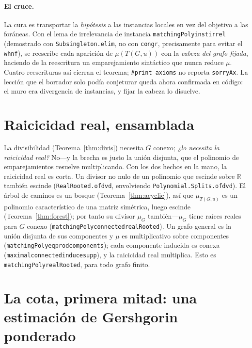 \documentclass[11pt]{article}
\newcommand{\lean}[1]{{\def\_{\textunderscore\allowbreak}\texttt{#1}}}
\newcommand{\R}{\mathbb{R}}
\begin{document}
\paragraph{El cruce.} La cura es transportar la \emph{hip\'otesis} a las instancias
locales en vez del objetivo a las for\'aneas. Con el lema de irrelevancia de
instancia \lean{matchingPoly\_inst\_irrel} (demostrado con \lean{Subsingleton.elim},
no con \lean{congr}, precisamente para evitar el \lean{whnf}), se reescribe cada
aparici\'on de $\mu(T(G,u))$ con la \emph{cabeza del grafo fijada}, haciendo de la
reescritura un emparejamiento sint\'actico que nunca reduce $\mu$. Cuatro
reescrituras as\'i cierran el teorema; \lean{\#print axioms} no reporta
\lean{sorryAx}. La lecci\'on que el borrador solo pod\'ia conjeturar queda ahora
confirmada en c\'odigo: el muro era divergencia de instancias, y fijar la cabeza lo
disuelve.

\section{Raicicidad real, ensamblada}
\label{sec:realrooted}

La divisibilidad (Teorema~\ref{thm:divis}) necesita $G$ conexo; \emph{¿lo necesita
la raicicidad real?} No---y la brecha es justo la uni\'on disjunta, que el polinomio
de emparejamientos resuelve multiplicando. Con los dos hechos en la mano, la
raicicidad real es corta. Un divisor no nulo de un polinomio que escinde sobre $\R$
tambi\'en escinde (\lean{RealRooted.of\_dvd}, envolviendo
\lean{Polynomial.Splits.of\_dvd}). El \'arbol de caminos es un bosque
(Teorema~\ref{thm:acyclic}), as\'i que $\mu_{T(G,u)}$ es un polinomio
caracter\'istico de una matriz sim\'etrica, luego escinde (Teorema~\ref{thm:forest});
por tanto su divisor $\mu_G$ tambi\'en---$\mu_G$ tiene ra\'ices reales para $G$
conexo (\lean{matchingPoly\_connected\_realRooted}). Un grafo general es la uni\'on
disjunta de sus componentes y $\mu$ es multiplicativo sobre componentes
(\lean{matchingPoly\_eq\_prod\_components}); cada componente inducida es conexa
(\lean{maximal\_connected\_induce\_supp}), y la raicicidad real multiplica. Esto es
\lean{matchingPoly\_realRooted}, para todo grafo finito.

\section{La cota, primera mitad: una estimaci\'on de Gershgorin ponderado}
\label{sec:gershgorin}
\end{document}
